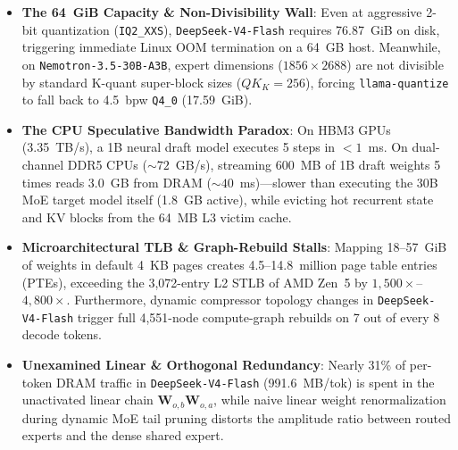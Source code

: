 \documentclass[10pt,twocolumn]{article}
\begin{document}
\begin{itemize}
    \item \textbf{The 64~GiB Capacity \& Non-Divisibility Wall}: Even at aggressive 2-bit quantization (\texttt{IQ2\_XXS}), \texttt{DeepSeek-V4-Flash} requires 76.87~GiB on disk, triggering immediate Linux OOM termination on a 64~GB host. Meanwhile, on \texttt{Nemotron-3.5-30B-A3B}, expert dimensions ($1856 \times 2688$) are not divisible by standard K-quant super-block sizes ($QK_K = 256$), forcing \texttt{llama-quantize} to fall back to 4.5~bpw \texttt{Q4\_0} (17.59~GiB).
    \item \textbf{The CPU Speculative Bandwidth Paradox}: On HBM3 GPUs (3.35~TB/s), a 1B neural draft model executes 5 steps in $<1$~ms. On dual-channel DDR5 CPUs ($\sim 72$~GB/s), streaming 600~MB of 1B draft weights 5 times reads 3.0~GB from DRAM ($\sim 40$~ms)---slower than executing the 30B MoE target model itself (1.8~GB active), while evicting hot recurrent state and KV blocks from the 64~MB L3 victim cache.
    \item \textbf{Microarchitectural TLB \& Graph-Rebuild Stalls}: Mapping 18--57~GiB of weights in default 4~KB pages creates 4.5--14.8~million page table entries (PTEs), exceeding the 3,072-entry L2 STLB of AMD Zen~5 by $1,500\times$--$4,800\times$. Furthermore, dynamic compressor topology changes in \texttt{DeepSeek-V4-Flash} trigger full 4,551-node compute-graph rebuilds on 7 out of every 8 decode tokens.
    \item \textbf{Unexamined Linear \& Orthogonal Redundancy}: Nearly 31\% of per-token DRAM traffic in \texttt{DeepSeek-V4-Flash} (991.6~MB/tok) is spent in the unactivated linear chain $\mathbf{W}_{o,b} \mathbf{W}_{o,a}$, while naive linear weight renormalization during dynamic MoE tail pruning distorts the amplitude ratio between routed experts and the dense shared expert.
\end{itemize}
\end{document}
